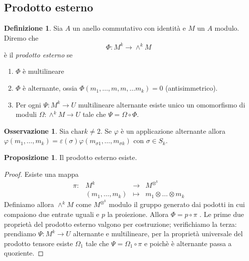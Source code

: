 \documentclass[a4paper,11pt,oneside]{book}
\theoremstyle{definition}
\newtheorem{de}{Definizione}
\newtheorem{prop}{Proposizione}
\newtheorem{oss}[section]{Osservazione}
\begin{document}
   \subsection{Prodotto esterno}
    
    \begin{de}
    Sia $A$ un anello commutativo con identità e $M$ un $A$ modulo. Diremo che 
    \[\Phi\colon M^k \longrightarrow \wedge^k M  \]
    è il \emph{prodotto esterno} se 
    \begin{enumerate}
     \item $\Phi$ è multilineare
     \item $\Phi$ è alternante, ossia $\Phi(m_1,\dots, m,m, \dots m_k)=0$ (antisimmetrico).
     \item Per ogni $\Psi \colon M^k \rightarrow U $ multilineare alternante esiste unico un omomorfismo di moduli
	    $\Omega\colon \wedge^k M \rightarrow U$ tale che $\Psi=\Omega \circ \Phi$.
    \end{enumerate}
    \end{de}
    \begin{oss}
     Sia $\text{char} k \neq 2$. Se $\varphi$ è un applicazione alternante allora 
     $\varphi(m_1, \dots, m_k)=\varepsilon(\sigma)\varphi(m_{\sigma 1}, \dots, m_{\sigma k})$ con $\sigma \in S_k$.
    \end{oss}

    \begin{prop}
     Il prodotto esterno esiste.
    \end{prop}
    \begin{proof}
     Esiste una mappa 
     \[
     \begin{matrix}
      \pi \colon& M^k&\longrightarrow & M^{\otimes^ k}\\
		& (m_1, \dots, m_k) & \longmapsto &  m_1\otimes \dots\otimes m_k  
     \end{matrix}    
     \]
      Definiamo allora $\wedge^kM$ come $M^{\otimes^ k}$ modulo il gruppo generato dai podotti in cui compaiono due entrate
      uguali e $p$ la proiezione. Allora $\Phi=p\circ\pi$ . Le prime due proprietà del prodotto esterno valgono per costruzione;
      verifichiamo la terza: prendiamo $\Psi \colon M^k \rightarrow U $ alternante e multilineare,
      per la proprietà universale del prodotto tensore esiste $\Omega_1$  tale che $\Psi=\Omega_1\circ \pi$ e poichè è alternante
      passa a quoziente.
    \end{proof}
\end{document}
